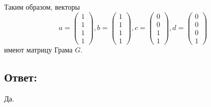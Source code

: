 \documentclass[12pt]{article}
\begin{document}
    Таким образом, векторы
    \[
        a =
        \begin{pmatrix}
            1 \\ 1 \\ 1 \\ 1
        \end{pmatrix} ,
        b =
        \begin{pmatrix}
            1 \\ 1 \\ 1 \\ 1
        \end{pmatrix} ,
        c =
        \begin{pmatrix}
            0 \\ 0 \\ 1 \\ 1
        \end{pmatrix} ,
        d =
        \begin{pmatrix}
            0 \\ 0 \\ 0 \\ 1
        \end{pmatrix}
    \]
    имеют матрицу Грама $G$.

    \subsection*{Ответ:}
    Да.
\end{document}
